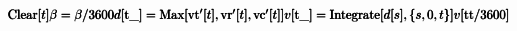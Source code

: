     \begin{doublespace}
        \noindent\(\pmb{\text{Clear}[t]}\\
        \pmb{\beta =\beta /3600}\\
        \pmb{d[\text{t$\_$}] = \text{Max}[\text{vt}'[t],\text{vr}'[t], \text{vc}'[t]]}\\
        \pmb{v[\text{t$\_$}] = \text{Integrate}[d[s], \{s, 0, t\}]}\\
        \pmb{v[\text{tt}/3600]}\)
    \end{doublespace}